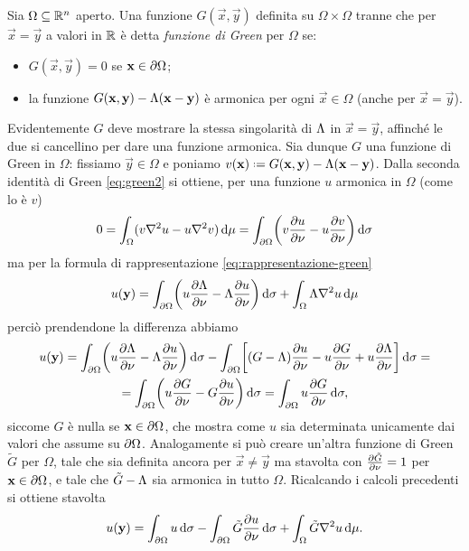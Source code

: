 \begin{definizione} \label{d:funzione-green}
    Sia $\Omega\subseteq\mathbb{R}^n$ aperto.
    Una funzione $G(\vec x,\vec y)$ definita su $\Omega\times\Omega$ tranne che per $\vec x=\vec y$ a valori in $\mathbb{R}$ è detta \emph{funzione di Green} per $\Omega$ se:
    \begin{itemize}
        \item $G(\vec x,\vec y)=0$ se $\mathbf{x}\in\partial\Omega$;
        \item la funzione $G(\mathbf{x},\mathbf{y})-\Lambda(\mathbf{x}-\mathbf{y})$ è armonica per ogni $\vec x\in\Omega$ (anche per $\vec x=\vec y$).
    \end{itemize}
\end{definizione}
Evidentemente $G$ deve mostrare la stessa singolarità di $\Lambda$ in $\vec x=\vec y$, affinch\'e le due si cancellino per dare una funzione armonica.
Sia dunque $G$ una funzione di Green in $\Omega$: fissiamo $\vec y\in\Omega$ e poniamo $v(\vec x)\defeq G(\vec x,\vec y)-\sfl(\vec x-\vec y)$.
Dalla seconda identità di Green \eqref{eq:green2} si ottiene, per una funzione $u$ armonica in $\Omega$ (come lo è $v$)
\begin{equation}
    0=\int_\Omega (v\nabla^2 u-u\nabla^2 v)\,\textup{d}\mu=\int_{\partial\Omega}\biggl(v\frac{\partial {u}}{\partial {\nu}}-u\frac{\partial {v}}{\partial {\nu}}\biggr)\,\textup{d}\sigma
\end{equation}
ma per la formula di rappresentazione \eqref{eq:rappresentazione-green}
\begin{equation}
    u(\mathbf{y})=\int_{\partial\Omega}\biggl(u\frac{\partial {\Lambda}}{\partial {\nu}}-\Lambda\frac{\partial {u}}{\partial {\nu}}\biggr)\,\textup{d}\sigma+\int_\Omega \Lambda\nabla^2 u\,\textup{d}\mu
\end{equation}
perciò prendendone la differenza abbiamo
\begin{multline}
        u(\mathbf{y})=
        \int_{\partial\Omega} \biggl(u\frac{\partial {\Lambda}}{\partial {\nu}}-\Lambda\frac{\partial {u}}{\partial {\nu}}\biggr)\,\textup{d}\sigma-\int_{\partial\Omega}\biggl[(G-\Lambda)\frac{\partial {u}}{\partial {\nu}}-u\frac{\partial {G}}{\partial {\nu}}+u\frac{\partial {\Lambda}}{\partial {\nu}}\biggr]\,\textup{d}\sigma=\\=
        \int_{\partial\Omega} \biggl(u\frac{\partial {G}}{\partial {\nu}}-G\frac{\partial {u}}{\partial {\nu}}\biggr)\,\textup{d}\sigma=
        \int_{\partial\Omega} u\frac{\partial {G}}{\partial {\nu}}\,\textup{d}\sigma,
\end{multline}
siccome $G$ è nulla se $\mathbf{x}\in\partial\Omega$, che mostra come $u$ sia determinata unicamente dai valori che assume su $\partial\Omega$.
Analogamente si può creare un'altra funzione di Green $\tilde{G}$ per $\Omega$, tale che sia definita ancora per $\vec x\ne\vec y$ ma stavolta con $\frac{\partial {\tilde{G}}}{\partial {\nu}}=1$ per $\mathbf{x}\in\partial\Omega$, e tale che $\tilde{G}-\Lambda$ sia armonica in tutto $\Omega$.
Ricalcando i calcoli precedenti si ottiene stavolta
\begin{equation}
    u(\mathbf{y})=
    \int_{\partial\Omega} u\,\textup{d}\sigma-\int_{\partial\Omega}\tilde{G}\frac{\partial {u}}{\partial {\nu}}\,\textup{d}\sigma+\int_\Omega\tilde{G}\nabla^2 u\,\textup{d}\mu.
\end{equation}

